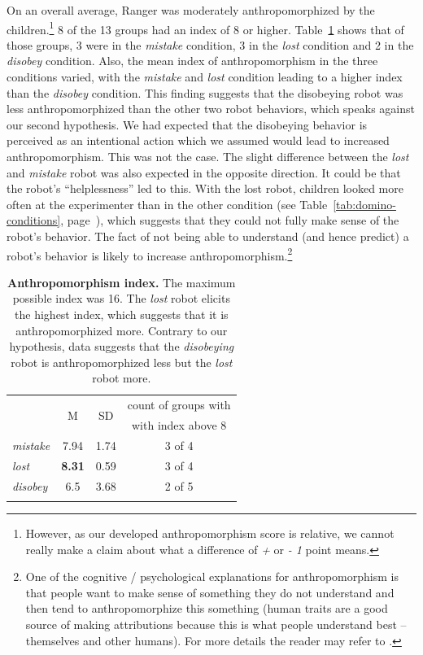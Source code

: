 \documentclass{sig-alternate}
\begin{document}
On an overall average, Ranger was moderately anthropomorphized by the
children.\footnote{However, as our developed anthropomorphism score is relative,
we cannot really make a claim about what a difference of \textit{+} or \textit{-
1} point means.} 8 of the 13 groups had an index of 8 or higher.
Table~\ref{tab:domino-anth-score} shows that of those groups, 3 were in the
\textit{mistake} condition, 3 in the \textit{lost} condition and 2 in the
\textit{disobey} condition. Also, the mean index of anthropomorphism in the
three conditions varied, with the \textit{mistake} and \textit{lost} condition
leading to a higher index than the \textit{disobey} condition.	This finding
suggests that the disobeying robot was less anthropomorphized than the other two
robot behaviors, which speaks against our second hypothesis. We had expected
that the disobeying behavior is perceived as an intentional action which we
assumed would lead to increased anthropomorphism. This was not the case. The
slight difference between the \textit{lost} and \textit{mistake} robot was also
expected in the opposite direction. It could be that the robot's
``helplessness'' led to this. With the lost robot, children looked more often at
the experimenter than in the other condition (see
Table~\ref{tab:domino-conditions}, page~\pageref{tab:domino-conditions}), which
suggests that they could not fully make sense of the robot's behavior. The fact
of not being able to understand (and hence predict) a robot's behavior is likely
to increase anthropomorphism.\footnote{One of the cognitive / psychological
explanations for anthropomorphism is that people want to make sense of something
they do not understand and then tend to anthropomorphize this something (human
traits are a good source of making attributions because this is what people
understand best -- themselves and other humans). For more details the reader may
refer to \cite{epley_seeing_2007}.}

\begin{table}[ht!]
\label{tab:domino-anth-score}       %
\centering
\footnotesize
\begin{tabular}{lccc}
\noalign{\smallskip}\noalign{\smallskip}\hline\noalign{\smallskip}
	& \multirow{2}{*}{M} & \multirow{2}{*}{SD} & count of groups with \\ 
	& & & with index above 8 \\
\noalign{\smallskip}\hline\hline
	\textit{mistake} & 7.94 & 1.74 & 3 of 4 \\ 
	\textit{lost} & \textbf{8.31} & 0.59 & 3 of 4 \\ 
	\textit{disobey} & 6.5 & 3.68 & 2 of 5 \\
\noalign{\smallskip}\hline
\end{tabular}
\caption{\textbf{Anthropomorphism index.} The maximum possible index was 16. The \textit{lost} robot elicits the highest index, which suggests that it is anthropomorphized more. Contrary to our hypothesis, data suggests that the \textit{disobeying} robot is anthropomorphized less but the \textit{lost} robot more.}
\end{table}	
\end{document}
